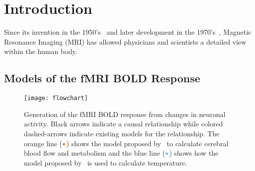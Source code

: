 \chapter{Introduction}



Since its invention in the 1950's~\citep{carr1954} and later development in the 1970's~\citep{lauterbur1973}, {M}agnetic {R}esonance {I}maging ({MRI}) has allowed physicians and scientists a detailed view within the human body.
  
  \section{Models of the fMRI BOLD Response}
  \label{sec:BOLDmodeling}
  
  \begin{figure}[bt]
    \centering
    \vspace{10pt}
    \texttt{[image: flowchart]}
    \caption[Generation of the fMRI BOLD response and a corresponding temperature change]{\label{fig:flowchart} Generation of the fMRI BOLD response from changes in neuronal activity.  Black arrows indicate a causal relationship while colored dashed-arrows indicate existing models for the relationship.  The orange line ($\color{goldfish}\bullet$) shows the model proposed by~\citet{sotero2011} to calculate cerebral blood flow and metabolism and the blue line ($\color{aoi}\bullet$) shows how the model proposed by~\citet{collins} is used to calculate temperature.}
  \end{figure}
